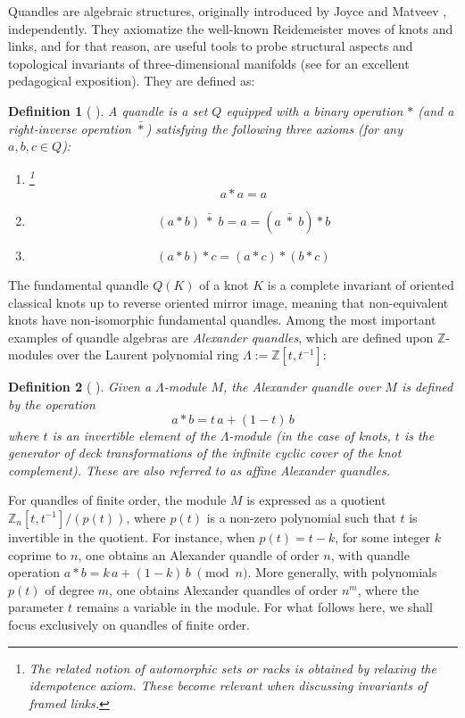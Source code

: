\documentclass[a4paper,12pt]{article}
\newtheorem{definition}{Definition}[section]
\newcommand{\Z}{\mathbb{Z}}
\newcommand{\Lam}{\Lambda}
\begin{document}
Quandles are algebraic structures, originally introduced by Joyce  \cite{joyce1982} and Matveev \cite{matveev1982}, independently. They axiomatize the well-known Reidemeister moves of knots and links, and for that reason, are useful tools to probe structural aspects and  topological invariants of three-dimensional manifolds (see \cite{el2015quandles} for an excellent pedagogical exposition). They are defined as:  
\begin{definition}[ \cite{joyce1982, matveev1982} ]  
\label{qaxioms}
A quandle is a set $Q$ equipped with a binary  operation $*$ (and a right-inverse operation $\bar{*}$) satisfying the following three axioms (for any $a, b, c \in Q$): 
\begin{enumerate}  
\item {}\footnote{The related notion of automorphic sets \cite{Brieskorn1988} or racks \cite{fenn1992racks} is obtained by relaxing the idempotence axiom. These become relevant when discussing invariants of framed links.}  $$a * a = a$$    
\item {}  $$(a * b) \;\bar{*}\; b = a = (a \;\bar{*}\; b) * b $$   
\item {}  
 $$ (a * b) * c = (a * c) * (b * c) $$  
 \end{enumerate} 
 \end{definition}
The fundamental quandle $Q(K)$ of a knot $K$ is a complete invariant of
oriented classical knots up to reverse oriented mirror image, meaning that non-equivalent knots have non-isomorphic fundamental quandles.  
Among the most important examples of quandle algebras are \emph{Alexander quandles}, which are defined upon $\Z$-modules over the Laurent polynomial ring  $\Lam := \Z[t, t^{-1}]$:  
 \begin{definition}[  \cite{joyce1982, matveev1982} ]
Given a $\Lam$-module $M$, the Alexander quandle over $M$ is defined by the operation 
\[
  a * b = t \, a + (1  -  t) \, b  
\] 
where $t$ is an invertible element of the $\Lam$-module (in the case of knots, $t$ is the generator of deck transformations of the infinite cyclic cover of the knot  complement). These are also referred to as \emph{affine Alexander quandles}.
 \end{definition}
For quandles of finite order, the module $M$ is expressed as a quotient  $\Z_n[t, t^{-1}]/(p(t))$, where  $p(t)$ is a non-zero polynomial such that $t$ is  invertible in the quotient.  For instance,  when $p(t) = t - k$, for some integer $k$ coprime to $n$, one obtains an    
Alexander quandle of order $n$, with quandle operation
$  a * b = k \, a + (1 - k) \, b \;  \pmod{n} $.      
More generally, with polynomials $p(t)$ of degree $m$, one obtains Alexander quandles of order $n^m$, where the parameter $t$ remains a variable in the module. For what follows here, we shall focus exclusively on quandles of finite order. 
\end{document}

